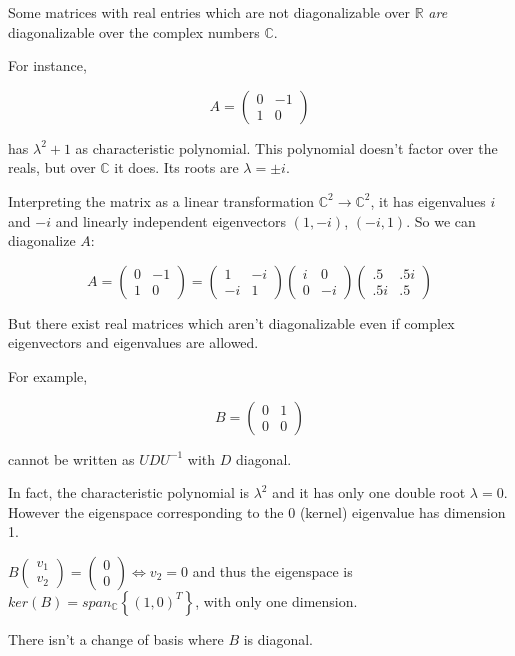 \documentclass[12pt]{article}
\begin{document}
Some matrices with real entries which are not diagonalizable over $\mathbb{R}$ \emph{are} diagonalizable over the complex numbers $\mathbb{C}$.

For instance,

\[A = \begin{pmatrix}
          0 &-1
       \\ 1 & 0
       \end{pmatrix} \]

has $\lambda^2+1$ as characteristic polynomial.
This  polynomial  doesn't factor over the reals, but over $\mathbb{C}$ it does. Its roots are $\lambda = \pm i$.

Interpreting the matrix as a linear transformation  $\mathbb{C}^2 \to \mathbb{C}^2$, it has eigenvalues $i$ and $-i$ and linearly independent eigenvectors $(1, -i)$, $(-i, 1)$.  So we can diagonalize $A$:

\[A = \begin{pmatrix}
0 &-1
\\ 1 & 0
\end{pmatrix}=\begin{pmatrix}
1 & -i
\\ -i & 1
\end{pmatrix}\begin{pmatrix}
i&0
\\0&-i
\end{pmatrix}\begin {pmatrix}
.5&.5i
\\.5i&.5 \end{pmatrix}\]

But there exist real matrices which aren't diagonalizable even if complex eigenvectors and eigenvalues are allowed.

For example,

\[B = \begin{pmatrix}
0 & 1
\\ 0 & 0
\end{pmatrix}\]

cannot be written as $U D U^{-1}$ with $D$ diagonal.

In fact, the characteristic polynomial is $\lambda^2$ and it has only one double root $\lambda=0$.
However the eigenspace corresponding to the $0$ (kernel) eigenvalue has dimension 1.

$B \begin{pmatrix}
v_1
\\v_2
\end{pmatrix}
=
\begin{pmatrix}
0
\\0
\end{pmatrix}
\iff v_2 = 0
$ and thus the eigenspace is $ker(B) = span_{\mathbb{C}}\left \{ (1,0)^T \right\}$, with only one dimension.

There isn't a change of basis where $B$ is diagonal.
\end{document}
